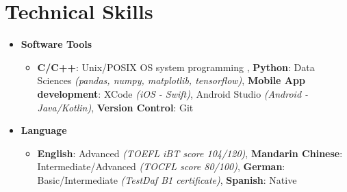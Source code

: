 \section{\sectionheading Technical Skills}

\begin{itemize}[leftmargin=0pt, label={}]%

\item{
{\sectionheading\large{\textbf{Software Tools}}}

    \vspace{-6pt}
    \begin{itemize}[label=\textbullet, leftmargin=*, noitemsep]
        \item{\textbf{C/C++}: Unix/POSIX OS system programming \textit{}, \textbf{Python}: Data Sciences \textit{(pandas, numpy, matplotlib, tensorflow)}, \textbf{Mobile App development}: XCode \textit{(iOS - Swift)}, Android Studio \textit{(Android - Java/Kotlin)}, \textbf{Version Control}: Git}
    \end{itemize}
}

\item{
{\sectionheading\large{\textbf{Language}}}

    \vspace{-6pt}
    \begin{itemize}[label=\textbullet, leftmargin=*, noitemsep]
        \item{\textbf{English}: Advanced \textit{(TOEFL iBT score 104/120)}, \textbf{Mandarin Chinese}: Intermediate/Advanced \textit{(TOCFL score 80/100)}, \textbf{German}: Basic/Intermediate \textit{(TestDaf B1 certificate)}, \textbf{Spanish}: Native}
    \end{itemize}
}
\end{itemize}
